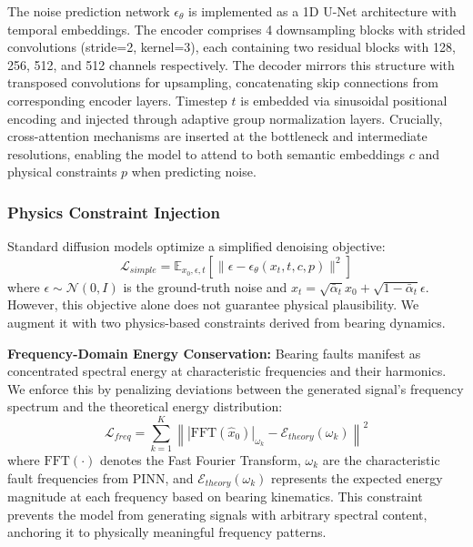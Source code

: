 The noise prediction network $\epsilon_\theta$ is implemented as a 1D U-Net architecture with temporal embeddings. The encoder comprises 4 downsampling blocks with strided convolutions (stride=2, kernel=3), each containing two residual blocks with 128, 256, 512, and 512 channels respectively. The decoder mirrors this structure with transposed convolutions for upsampling, concatenating skip connections from corresponding encoder layers. Timestep $t$ is embedded via sinusoidal positional encoding and injected through adaptive group normalization layers. Crucially, cross-attention mechanisms are inserted at the bottleneck and intermediate resolutions, enabling the model to attend to both semantic embeddings $c$ and physical constraints $p$ when predicting noise.

\subsubsection{Physics Constraint Injection}
Standard diffusion models optimize a simplified denoising objective:
\begin{equation}
    \mathcal{L}_{simple} = \mathbb{E}_{x_0, \epsilon, t} \left[ \|\epsilon - \epsilon_\theta(x_t, t, c, p)\|^2 \right]
    \label{eq:ddpm_loss}
\end{equation}
where $\epsilon \sim \mathcal{N}(0, I)$ is the ground-truth noise and $x_t = \sqrt{\bar{\alpha}_t}x_0 + \sqrt{1-\bar{\alpha}_t}\epsilon$. However, this objective alone does not guarantee physical plausibility. We augment it with two physics-based constraints derived from bearing dynamics.

\textbf{Frequency-Domain Energy Conservation:} Bearing faults manifest as concentrated spectral energy at characteristic frequencies and their harmonics. We enforce this by penalizing deviations between the generated signal's frequency spectrum and the theoretical energy distribution:
\begin{equation}
    \mathcal{L}_{freq} = \sum_{k=1}^K \left\| |\text{FFT}(\hat{x}_0)|_{\omega_k} - \mathcal{E}_{theory}(\omega_k) \right\|^2
    \label{eq:freq_loss}
\end{equation}
where $\text{FFT}(\cdot)$ denotes the Fast Fourier Transform, $\omega_k$ are the characteristic fault frequencies from PINN, and $\mathcal{E}_{theory}(\omega_k)$ represents the expected energy magnitude at each frequency based on bearing kinematics. This constraint prevents the model from generating signals with arbitrary spectral content, anchoring it to physically meaningful frequency patterns.

